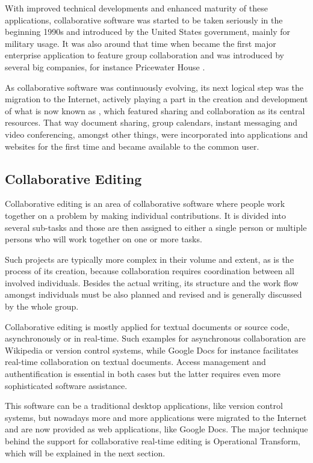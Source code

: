 \pagebreak

With improved technical developments and enhanced maturity of these applications, collaborative software was started to be taken seriously in the beginning 1990s and introduced by the United States government, mainly for military usage. It was also around that time when  became the first major enterprise application to feature group collaboration and was introduced by several big companies, for instance Pricewater House \cite{website:notes-history}.

As collaborative software was continuously evolving, its next logical step was the migration to the Internet, actively playing a part in the creation and development of what is now known as , which featured sharing and collaboration as its central resources. That way document sharing, group calendars, instant messaging and video conferencing, amongst other things, were incorporated into applications and websites for the first time and became available to the common user.

\subsection{Collaborative Editing}
\label{subsec:collaborative-editing-foundations}
Collaborative editing is an area of collaborative software where people work together on a problem by making individual contributions. It is divided into several sub-tasks and those are then assigned to either a single person or multiple persons who will work together on one or more tasks.

Such projects are typically more complex in their volume and extent, as is the process of its creation, because collaboration requires coordination between all involved individuals. Besides the actual writing, its structure and the work flow amongst individuals must be also planned and revised and is generally discussed by the whole group.

Collaborative editing is mostly applied for textual documents or source code, asynchronously or in real-time. Such examples for asynchronous collaboration are Wikipedia or version control systems, while Google Docs for instance facilitates real-time collaboration on textual documents. Access management and authentification is essential in both cases but the latter requires even more sophisticated software assistance. 

This software can be a traditional desktop applications, like version control systems, but nowadays more and more applications were migrated to the Internet and are now provided as web applications, like Google Docs. The major technique behind the support for collaborative real-time editing is Operational Transform, which will be explained in the next section.


